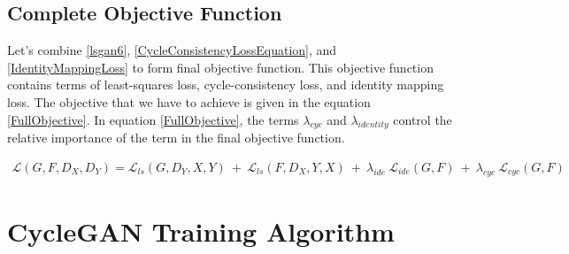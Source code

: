 \subsection{Complete Objective Function}

Let's combine \ref{lsgan6}, \ref{CycleConsistencyLossEquation}, and \ref{IdentityMappingLoss} to form final objective function. This objective function contains terms of least-squares loss, cycle-consistency loss, and identity mapping loss. The objective that we have to achieve is given in the equation \ref{FullObjective}. In equation \ref{FullObjective}, the terms $\lambda_{cyc}$ and $\lambda_{identity}$ control the relative importance of the term in the final objective function.


\begin{equation}\label{FullObjective}
\begin{aligned}
    \mathcal{L}(G, F, D_X, D_Y) =  \mathcal{L}_{ls}(G, D_Y, X, Y)\ +\ \mathcal{L}_{ls}(F, D_X, Y, X)\ +\ 
    \lambda_{ide}\ \mathcal{L}_{ide}(G, F)\ +\ \lambda_{cyc}\ \mathcal{L}_{cyc}(G, F)
\end{aligned}
\end{equation}
    

\section{\ac{CycleGAN} Training Algorithm}\label{CycleGANAlgorithm}



